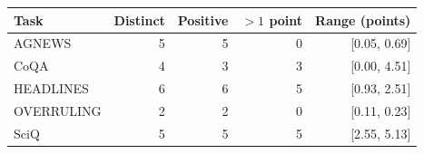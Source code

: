 \begin{tabular}{lrrrr}
\toprule
Task & Distinct & Positive & $>1$ point & Range (points) \\
\midrule
AGNEWS & 5 & 5 & 0 & [0.05, 0.69] \\
CoQA & 4 & 3 & 3 & [0.00, 4.51] \\
HEADLINES & 6 & 6 & 5 & [0.93, 2.51] \\
OVERRULING & 2 & 2 & 0 & [0.11, 0.23] \\
SciQ & 5 & 5 & 5 & [2.55, 5.13] \\
\bottomrule
\end{tabular}
